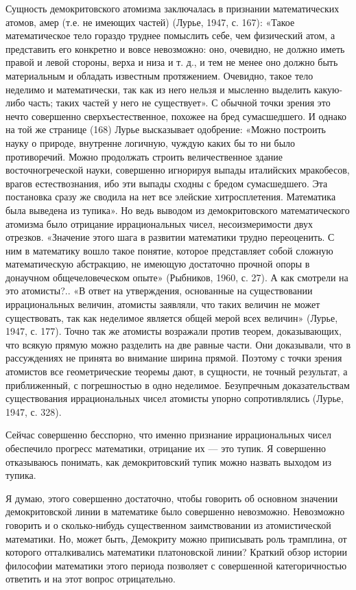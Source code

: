 Сущность демокритовского атомизма заключалась в признании
математических атомов, амер (т.е. не имеющих частей) (Лурье, 1947, с.
167): «Такое математическое тело гораздо труднее помыслить себе, чем
физический атом, а представить его конкретно и вовсе невозможно: оно,
очевидно, не должно иметь правой и левой стороны, верха и низа и т.
д., и тем не менее оно должно быть материальным и обладать известным
протяжением. Очевидно, такое тело неделимо и математически, так как из
него нельзя и мысленно выделить какую-либо часть; таких частей у него
не существует». С обычной точки зрения это нечто совершенно
сверхъестественное, похожее на бред сумасшедшего. И однако на той же
странице (168) Лурье высказывает одобрение: «Можно построить науку о
природе, внутренне логичную, чуждую каких бы то ни было противоречий.
Можно продолжать строить величественное здание восточногреческой
науки, совершенно игнорируя выпады италийских мракобесов, врагов
естествознания, ибо эти выпады сходны с бредом сумасшедшего. Эта
постановка сразу же сводила на нет все элейские хитросплетения.
Математика была выведена из тупика». Но ведь выводом из
демокритовского математического атомизма было отрицание иррациональных
чисел, несоизмеримости двух отрезков. «Значение этого шага в развитии
математики трудно переоценить. С ним в математику вошло такое понятие,
которое представляет собой сложную математическую абстракцию, не
имеющую достаточно прочной опоры в донаучном общечеловеческом опыте»
(Рыбников, 1960, с. 27). А как смотрели на это атомисты?.. «В ответ на
утверждения, основанные на существовании иррациональных величин,
атомисты заявляли, что таких величин не может существовать, так как
неделимое является общей мерой всех величин» (Лурье, 1947, с. 177).
Точно так же атомисты возражали против теорем, доказывающих, что
всякую прямую можно разделить на две равные части. Они доказывали, что
в рассуждениях не принята во внимание ширина прямой. Поэтому с точки
зрения атомистов все геометрические теоремы дают, в сущности, не
точный результат, а приближенный, с погрешностью в одно неделимое.
Безупречным доказательствам существования иррациональных чисел
атомисты упорно сопротивлялись (Лурье, 1947, с. 328).

Сейчас совершенно бесспорно, что именно признание иррациональных чисел
обеспечило прогресс математики, отрицание их --- это тупик. Я
совершенно отказываюсь понимать, как демокритовский тупик можно
назвать выходом из тупика.

Я думаю, этого совершенно достаточно, чтобы говорить об основном
значении демокритовской линии в математике было совершенно невозможно.
Невозможно говорить и о сколько-нибудь существенном заимствовании из
атомистической математики. Но, может быть, Демокриту можно приписывать
роль трамплина, от которого отталкивались математики платоновской
линии? Краткий обзор истории философии математики этого периода
позволяет с совершенной категоричностью ответить и на этот вопрос
отрицательно.

